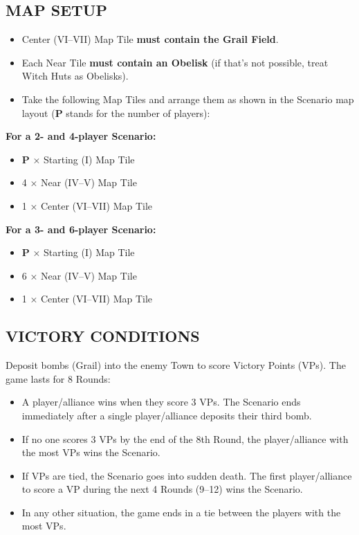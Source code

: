 \begin{multicols}{2}
\subsection*{\MakeUppercase{Map Setup}}
\begin{itemize}
  \item Center (VI--VII) Map Tile \textbf{must contain the Grail Field}.
  \item Each Near Tile \textbf{must contain an Obelisk} (if that's not possible, treat Witch Huts as Obelisks).
  \item Take the following Map Tiles and arrange them as shown in the Scenario map layout ($\boldsymbol{P}$ stands for the number of players):
\end{itemize}

\textbf{For a 2- and 4-player Scenario:}
\begin{itemize}
  \item $\boldsymbol{P}$ × Starting (I) Map Tile
  \item 4 × Near (IV--V) Map Tile
  \item 1 × Center (VI--VII) Map Tile
\end{itemize}

\textbf{For a 3- and 6-player Scenario:}
\begin{itemize}
  \item $\boldsymbol{P}$ × Starting (I) Map Tile
  \item 6 × Near (IV--V) Map Tile
  \item 1 × Center (VI--VII) Map Tile
\end{itemize}

\subsection*{\MakeUppercase{Victory Conditions}}

Deposit bombs (Grail) into the enemy Town to score Victory Points (VPs).
The game lasts for 8 Rounds:
\begin{itemize}
  \item A player/alliance wins when they score 3 VPs. The Scenario ends immediately after a single player/alliance deposits their third bomb.
  \item If no one scores 3 VPs by the end of the 8th Round, the player/alliance with the most VPs wins the Scenario.
  \item If VPs are tied, the Scenario goes into sudden death. The first player/alliance to score a VP during the next 4 Rounds (9--12) wins the Scenario.
  \newpage
  \item In any other situation, the game ends in a tie between the players with the most VPs.
\end{itemize}


\end{multicols}
